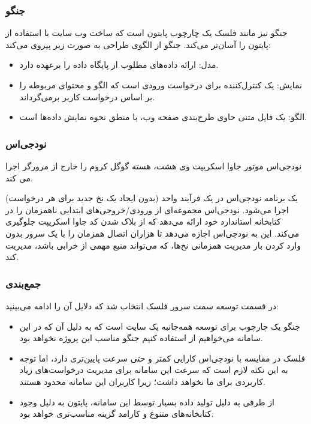 \subsubsection{جنگو }

جنگو نیز مانند فلسک یک چارچوب پایتون است که ساخت وب سایت با استفاده از پایتون را آسان‌تر می‌کند. جنگو از الگوی طراحی  به صورت زیر پیروی می‌کند\cite{noauthor_django_nodate}:

\begin{itemize}
    \item مدل: ارائه داده‌های مطلوب از پایگاه داده را برعهده دارد.
    \item نمایش: یک کنترل‌کننده برای درخواست ورودی است که الگو و محتوای مربوطه را بر اساس درخواست کاربر برمی‌گرداند.
    \item الگو: یک فایل متنی حاوی طرح‌بندی صفحه وب، با منطق نحوه نمایش داده‌ها است.
\end{itemize}

\newpage

\subsubsection{نودجی‌اس}
نودجی‌اس موتور جاوا اسکریپت وی هشت، هسته گوگل کروم را خارج از مرورگر اجرا می کند.

یک برنامه نودجی‌اس در یک فرآیند واحد (بدون ایجاد یک نخ جدید برای هر درخواست) اجرا می‌شود. نودجی‌اس مجموعه‌ای از ورودی/خروجی‌های ابتدایی ناهمزمان را در کتابخانه استاندارد خود ارائه می‌دهد که از بلاک شدن کد جاوا اسکریپت جلوگیری می‌کند. این به نودجی‌اس اجازه می‌دهد تا هزاران اتصال همزمان را با یک سرور بدون وارد کردن بار مدیریت همزمانی نخ‌ها، که می‌تواند منبع مهمی از خرابی باشد، مدیریت کند\cite{noauthor_introduction_nodate}.

\subsubsection{جمع‌بندی}
در قسمت توسعه سمت سرور فلسک انتخاب شد که دلایل آن را ادامه می‌بینید:
\begin{itemize}
    \item جنگو یک چارچوب برای توسعه همه‌جانبه یک سایت است که به دلیل آن که در این سامانه می‌خواهیم از  استفاده کنیم جنگو مناسب این پروژه نخواهد بود.
    \item فلسک در مقایسه با نودجی‌اس کارایی کمتر و حتی سرعت پایین‌تری دارد، اما توجه به این نکته لازم است که سرعت این سامانه برای مدیریت درخواست‌های زیاد کاربردی برای ما نخواهد داشت؛ زیرا کاربران این سامانه محدود هستند.
    \item از طرفی به دلیل تولید داده بسیار توسط این سامانه، پایتون به دلیل وجود کتابخانه‌های متنوع و کارامد گزینه مناسب‌تری خواهد بود. 
\end{itemize}

